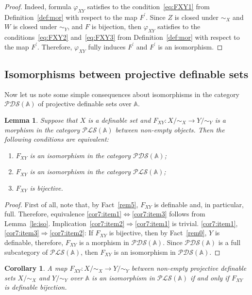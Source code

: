 \documentclass[12pt]{article}
\newtheorem{lemma}{Lemma}
\newtheorem{corollary}{Corollary}
\theoremstyle{definition}
\def\MA{{\mathbb{A}}}
\def\PLS{{\mathcal{PLS}}}
\def\PDS{{\mathcal{PDS}}}
\begin{document}
\begin{proof}
    Indeed, formula $\varphi_{XY}$ satisfies to the condition~\ref{eq:FXY1} from Definition~\ref{def:mor} with respect to the map $F^\prime$. Since $Z$ is closed under $\sim_X$ and $W$ is closed under $\sim_Y$, and $F$ is bijection, then $\varphi_{XY}$ satisfies to the conditions~\ref{eq:FXY2} and~\ref{eq:FXY3} from Definition~\ref{def:mor} with respect to the map $F^\prime$. Therefore, $\varphi_{XY}$ fully induces $F^\prime$ and $F^\prime$ is an isomorphism.
\end{proof}

\subsection{Isomorphisms between projective definable sets}\label{subsec:iso_PDS}

Now let us note some simple consequences about isomorphisms in the category $\PDS(\MA)$ of projective definable sets over $\MA$.

\begin{lemma}\label{cor7}
Suppose that $X$ is a definable set and $F_{XY}\colon X/{\sim_X}\to Y/{\sim_Y}$ is a morphism in the category $\PLS(\MA)$ between non-empty objects. Then the following conditions are equivalent:
\begin{enumerate}[label=\arabic*)]
\item\label{cor7:item2} $F_{XY}$ is an isomorphism in the category $\PDS(\MA)$;
\item\label{cor7:item1} $F_{XY}$ is an isomorphism in the category $\PLS(\MA)$;
    \item\label{cor7:item3} $F_{XY}$ is bijective.   
\end{enumerate}
\end{lemma}

\begin{proof}
First of all, note that, by Fact~\ref{rem5}, $F_{XY}$ is definable and, in particular, full. Therefore, equivalence \ref{cor7:item1}$\Longleftrightarrow$\ref{cor7:item3} follows from Lemma~\ref{le:iso}. Implication~\ref{cor7:item2}$\Longrightarrow$\ref{cor7:item1} is trivial. 
\ref{cor7:item1},\ref{cor7:item3}$\Longrightarrow$\ref{cor7:item2}: If $F_{XY}$ is bijective, then by Fact~\ref{rem0}, $Y$ is definable, therefore, $F_{XY}$ is a morphism in $\PDS(\MA)$. Since $\PDS(\MA)$ is a full subcategory of $\PLS(\MA)$, then $F_{XY}$ is an isomorphism in $\PDS(\MA)$.
\end{proof}

\begin{corollary}\label{cor:iso_def}
A map $F_{XY}\colon X/{\sim_X}\to Y/{\sim_Y}$ between non-empty projective definable sets $X/{\sim_X}$ and $Y/{\sim_Y}$ over $\MA$ is an isomorphism in $\PLS(\MA)$ if and only if $F_{XY}$ is definable bijection.
\end{corollary}
\end{document}
